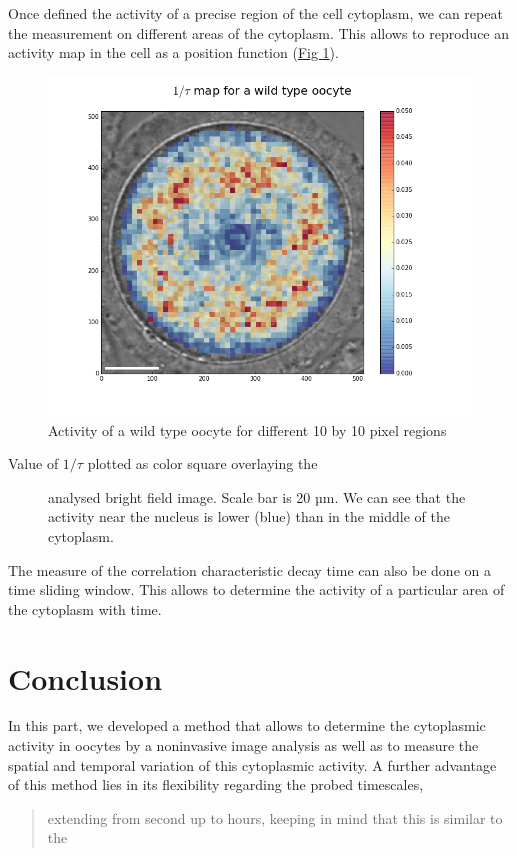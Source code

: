 \documentclass[A4paperpaper,11pt,english]{sphinxmanual}
\begin{document}
Once defined the activity of a precise region of the cell cytoplasm, we
can repeat the measurement on different areas of the cytoplasm. This allows to
reproduce an activity map in the cell as a position function (\hyperref[index-latex:fig-activity-map]{Fig  \ref*{index-latex:fig-activity-map}}).
\begin{figure}[htbp]
\centering
\capstart

\includegraphics[width=0.950\linewidth]{CellAct-WT.png}
\caption{Activity of a wild type oocyte for different 10 by 10 pixel regions}\label{index-latex:fig-activity-map}\end{figure}
\begin{description}
\item[{Value of \(1/\tau\) plotted as color square overlaying the}] \leavevmode
analysed bright field image. Scale
bar is 20 µm. We can see that the activity near the nucleus is lower
(blue) than in the middle of the cytoplasm.

\end{description}

The measure of the correlation characteristic decay time can also be done on a
time sliding window.  This allows to determine the activity of a
particular area of the cytoplasm with time.


\section{Conclusion}
\label{index-latex:conclusion}
In this part, we developed a method that allows to determine the cytoplasmic
activity in oocytes by a noninvasive image analysis
as well as to measure the spatial and temporal variation of this cytoplasmic
activity. A further advantage of this method lies in its flexibility regarding the probed timescales,
\begin{quote}

extending from second up to hours, keeping in mind that this is similar to the
\end{quote}
\end{document}

